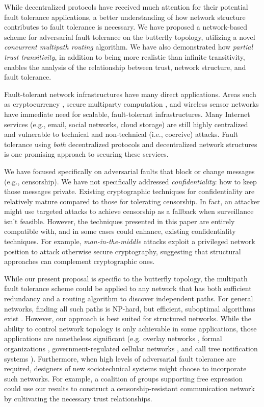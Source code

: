 \documentclass{sig-alternate-05-2015}
\begin{document}
While decentralized protocols have received much attention for their potential
fault tolerance applications,
a better understanding of how network structure contributes to fault tolerance
is necessary.
We have proposed a network-based scheme for adversarial fault tolerance on the
butterfly topology,
utilizing a novel {\em concurrent multipath routing} algorithm.
We have also demonstrated how {\em partial trust transitivity},
in addition to being more realistic than infinite transitivity,
enables the analysis of the relationship between trust, network structure,
and fault tolerance.

Fault-tolerant network infrastructures have many direct applications.
Areas such as cryptocurrency
\cite{mazieres_stellar_2015,nakamoto_bitcoin:_2008,king_ppcoin:_2012},
secure multiparty computation
\cite{yao_protocols_1982,chaum_multiparty_1988,goldreich_how_1987},
and wireless sensor networks
\cite{khiani_comparative_2013}
have immediate need for scalable, fault-tolerant infrastructures.
Many Internet services (e.g., email, social networks, cloud storage)
are still highly centralized and vulnerable to technical and
non-technical (i.e., coercive) attacks.
Fault tolerance using {\em both}
decentralized protocols and
decentralized network structures
is one promising approach to securing these services.

We have focused specifically on adversarial faults that block or
change messages (e.g., censorship).
We have not specifically addressed {\em confidentiality}:
how to keep those messages private.
Existing cryptographic techniques for confidentiality are relatively
mature compared to those for tolerating censorship.
In fact, an attacker might use targeted attacks to achieve censorship
as a fallback when surveillance isn't feasible.
However, the techniques presented in this paper
are entirely compatible with, and in some cases could enhance, existing
confidentiality techniques.
For example, {\em man-in-the-middle} attacks exploit a privileged
network position to attack otherwise secure cryptography,
suggesting that structural approaches can complement cryptographic ones.

While our present proposal is specific to the butterfly topology,
the multipath fault tolerance scheme could
be applied to any network that has both sufficient redundancy and a
routing algorithm to discover independent paths.
For general networks, finding all such paths is NP-hard,
but efficient, suboptimal algorithms exist
\cite{reiter_resilient_1998}.
However, our approach is best suited for structured networks.
While the ability to control network topology is only achievable in some
applications, those applications are nonetheless significant
(e.g. overlay networks \cite{lua_survey_2005, korzun_structured_2013},
formal organizations \cite{mohr_explaining_1982},
government-regulated cellular networks \cite{walker_mass_2012},
and call tree notification systems \cite{nickerson_thinking_2010}).
Furthermore, when high levels of adversarial fault tolerance are required,
designers of new sociotechnical systems might choose to
incorporate such networks.
For example,
a coalition of groups supporting free expression could use our results
to construct a censorship-resistant communication network
by cultivating the necessary trust relationships.
\end{document}
